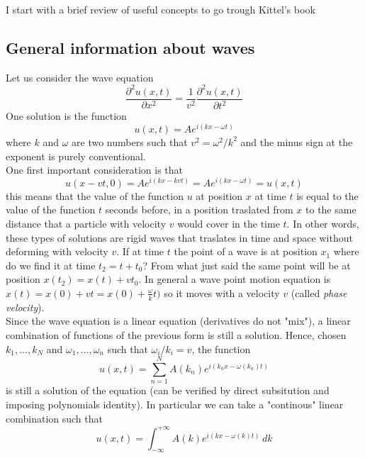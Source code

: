 I start with a brief review of useful concepts to go trough Kittel's book

\subsection*{General information about waves}
Let us consider the wave equation 
\begin{equation*}
    \frac{\partial^2u(x,t)}{\partial x^2} = \frac{1}{v^2} \frac{\partial^2u(x,t)}{\partial t^2}
\end{equation*}
One solution is the function 
\begin{equation}
    u(x,t) = Ae^{i(kx - \omega t)}
    \label{eq:waveeq_solution}
\end{equation}
where $k$ and $\omega$ are two numbers such that $v^2 = \omega^2 / k^2$ and the minus sign at the exponent is purely conventional. \\
One first important consideration is that 
\begin{equation*}
    u(x-vt,0) = Ae^{i(kx - kvt)} = Ae^{i(kx - \omega t)} = u(x, t)
\end{equation*}
this means that the value of the function $u$ at position $x$ at time $t$ is equal to the value of the function $t$ seconds before, in a position
traslated from $x$ to the same distance that a particle with velocity $v$ would cover in the time $t$. In other words, these types of solutions
are rigid waves that traslates in time and space without deforming with velocity $v$. If at time $t$ the point of a wave is at position $x_1$ where do we find it 
at time $t_2 = t+t_0$? From what just said the same point will be at position $x(t_2) = x(t) + vt_0$. In general a wave point motion equation is $x(t) = x(0) + vt = x(0) + \frac{\omega}{k}t)$ so it moves
with a velocity $v$ (called \emph{phase velocity}). \\ 
Since the wave equation is a linear equation (derivatives do not "mix"), a linear combination of functions of the previous form is 
still a solution. Hence, chosen $k_1, \dots, k_N$ and $\omega_1, \dots, \omega_n$ such that $\omega_i/k_i = v$, the function 
\begin{equation*}
    u(x,t) = \sum_{n=1}^N A(k_n) e^{i(k_nx - \omega(k_n) t)}
\end{equation*}
is still a solution of the equation (can be verified by direct subsitution and imposing polynomials identity).
In particular we can take a "continous" linear combination such that 
\begin{equation}
    u(x,t) = \int_{-\infty}^{+\infty} A(k) e^{i(kx - \omega(k)t)} \, dk
    \label{eq:waves_superposition}
\end{equation}
